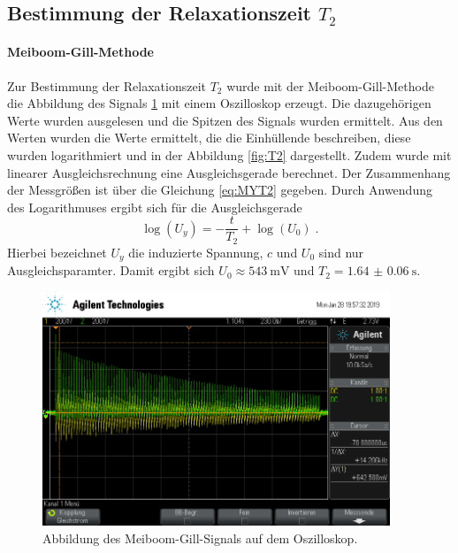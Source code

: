 \subsection{Bestimmung der Relaxationszeit \texorpdfstring{$T_2$}{math}}
\paragraph{Meiboom-Gill-Methode} Zur Bestimmung der Relaxationszeit $T_2$ wurde mit der Meiboom-Gill-Methode die 
Abbildung des Signals \ref{fig:MGMO} mit einem Oszilloskop erzeugt. Die dazugehörigen Werte wurden ausgelesen und die 
Spitzen des Signals wurden ermittelt. Aus den Werten wurden die Werte ermittelt, die die Einhüllende beschreiben, diese 
wurden logarithmiert und in der Abbildung \ref{fig:T2} dargestellt. Zudem wurde mit linearer Ausgleichsrechnung eine 
Ausgleichsgerade berechnet. Der Zusammenhang der Messgrößen ist über die Gleichung \eqref{eq:MYT2} gegeben. Durch 
Anwendung des Logarithmuses ergibt sich für die Ausgleichsgerade
\begin{equation}
\log(U_y) = - \frac{ t }{T_2} + \log(U_0)	\; .
\end{equation}
Hierbei bezeichnet $U_y$ die induzierte Spannung, $c$ und $U_0$ sind nur Ausgleichsparamter. 
Damit ergibt sich  $U_0 \approx \SI{543}{\milli\volt}$ und $T_2 = \SI{1.64(6)}{\second}$.
\begin{figure}
  \centering
  \includegraphics[height = 7cm]{plots/scope_1.png}
  \caption{Abbildung des Meiboom-Gill-Signals auf dem Oszilloskop.}
  \label{fig:MGMO}
\end{figure}
